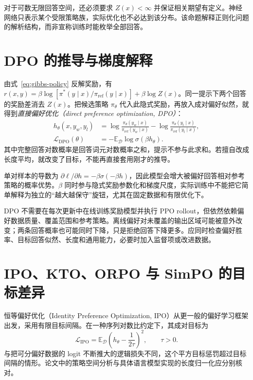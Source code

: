 对于可数无限回答空间，还必须要求 $Z(x)<\infty$ 并保证相关期望有定义。神经网络只表示某个受限策略族，实际优化也不必达到该分布。该命题解释正则化问题的解析结构，而非宣称训练时能枚举全部回答。

\section{DPO 的推导与梯度解释}

由式~\eqref{eq:gibbs-policy} 反解奖励，有 $r(x,y)=\beta\log[\pi^*(y\mid x)/\pi_{\mathrm{ref}}(y\mid x)]+\beta\log Z(x)$。同一提示下两个回答的奖励差消去 $Z(x)$。把候选策略 $\pi_\theta$ 代入此隐式奖励，再放入成对偏好似然，就得到\emph{直接偏好优化（direct preference optimization, DPO）}\cite{dpo}：
\begin{align}
h_\theta(x,y_w,y_l)&=\log\frac{\pi_\theta(y_w\mid x)}{\pi_{\mathrm{ref}}(y_w\mid x)}
-\log\frac{\pi_\theta(y_l\mid x)}{\pi_{\mathrm{ref}}(y_l\mid x)},\\
\mathcal L_{\mathrm{DPO}}(\theta)&=-\mathbb E_{\mathcal D}\log\sigma(\beta h_\theta).
\label{eq:dpo}
\end{align}
其中完整回答对数概率是回答词元对数概率之和，提示不参与此求和。若擅自改成长度平均，就改变了目标，不能再直接套用刚才的推导。

单对样本的导数为 $\partial\ell/\partial h=-\beta\sigma(-\beta h)$，因此模型会增大被偏好回答相对参考策略的概率优势。$\beta$ 同时参与隐式奖励参数化和梯度尺度，实际训练中不能把它简单解释为独立的“越大越保守”旋钮，尤其在固定数据和有限优化下。

DPO 不需要在每次更新中在线训练奖励模型并执行 PPO rollout，但依然依赖偏好数据质量、覆盖范围和参考策略。离线偏好对未覆盖的输出区域可能被意外改变；两条回答概率也可能同时下降，只是拒绝回答下降更多。应同时检查偏好胜率、目标回答似然、长度和通用能力，必要时加入监督项或改进数据。

\section{IPO、KTO、ORPO 与 SimPO 的目标差异}

恒等偏好优化（Identity Preference Optimization, IPO）从更一般的偏好学习框架出发，采用有限目标间隔。在一种序列对数比约定下，其成对目标为
\[
\mathcal L_{\mathrm{IPO}}=\mathbb E_{\mathcal D}\left(h_\theta-\frac1{2\tau}\right)^2,\qquad \tau>0.
\]
与把可分偏好数据的 logit 不断推大的逻辑损失不同，这个平方目标惩罚超过目标间隔的情形。论文中的策略空间分析与具体语言模型实现的长度归一化应分别核对\cite{ipo}。

